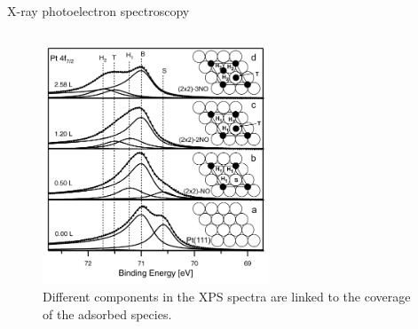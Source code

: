 \begin{frame}{X-ray photoelectron spectroscopy}
\begin{columns}
    \begin{figure}
        \centering
        \includegraphics[width=0.6\textwidth]{Figures/xps_data/xps_multiple_peaks.png}
        \caption{Different components in the XPS spectra are linked to the coverage of the adsorbed species\footnotemark{}.}
        \label{fig:xps_multiple_peaks}
    \end{figure}

    \vspace{-0.3cm}


    \end{columns}
    
    
\end{frame}